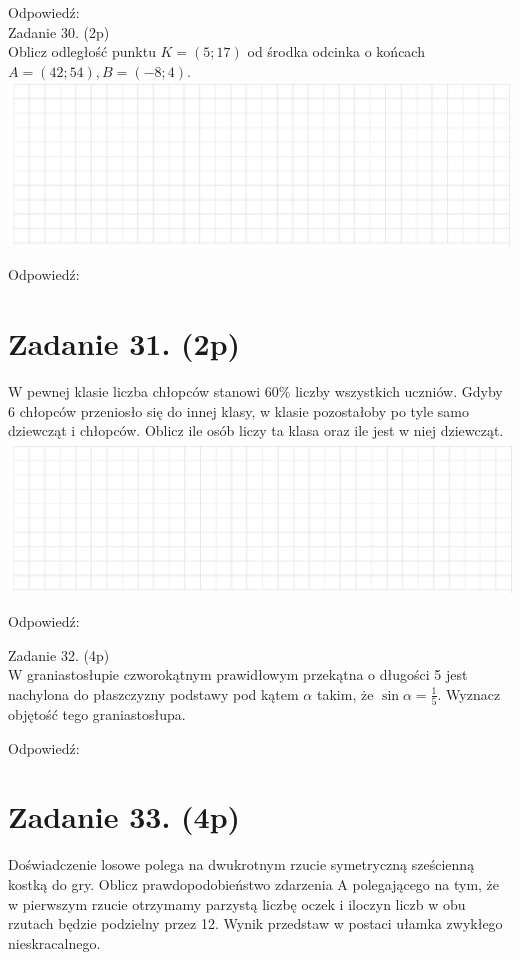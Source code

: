 \documentclass[10pt]{article}
\begin{document}
Odpowiedź:\\
Zadanie 30. (2p)\\
Oblicz odległość punktu \(K=(5 ; 17)\) od środka odcinka o końcach \(A=(42 ; 54), B=(-8 ; 4)\).\\
\includegraphics[max width=\textwidth, center]{2024_11_21_fb7e622176e162773107g-10(1)}

Odpowiedź:

\section*{Zadanie 31. (2p)}
W pewnej klasie liczba chłopców stanowi \(60 \%\) liczby wszystkich uczniów. Gdyby 6 chłopców przeniosło się do innej klasy, w klasie pozostałoby po tyle samo dziewcząt i chłopców. Oblicz ile osób liczy ta klasa oraz ile jest w niej dziewcząt.\\
\includegraphics[max width=\textwidth, center]{2024_11_21_fb7e622176e162773107g-10(2)}

Odpowiedź:

Zadanie 32. (4p)\\
W graniastosłupie czworokątnym prawidłowym przekątna o długości 5 jest nachylona do płaszczyzny podstawy pod kątem \(\alpha\) takim, że \(\sin \alpha=\frac{1}{5}\). Wyznacz objętość tego graniastosłupa.

Odpowiedź:

\section*{Zadanie 33. (4p)}
Doświadczenie losowe polega na dwukrotnym rzucie symetryczną sześcienną kostką do gry. Oblicz prawdopodobieństwo zdarzenia A polegającego na tym, że w pierwszym rzucie otrzymamy parzystą liczbę oczek i iloczyn liczb w obu rzutach będzie podzielny przez 12. Wynik przedstaw w postaci ułamka zwykłego nieskracalnego.
\end{document}
